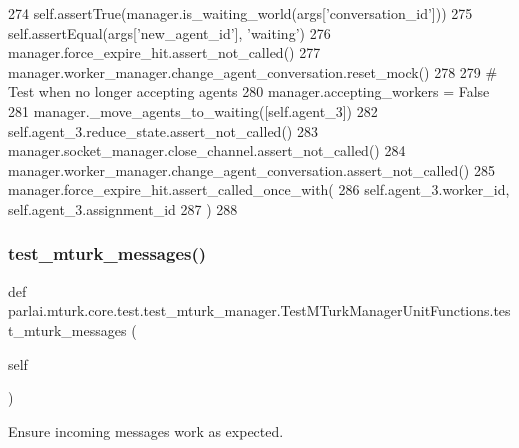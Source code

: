 \begin{DoxyCode}
274         self.assertTrue(manager.is\_waiting\_world(args[\textcolor{stringliteral}{'conversation\_id'}]))
275         self.assertEqual(args[\textcolor{stringliteral}{'new\_agent\_id'}], \textcolor{stringliteral}{'waiting'})
276         manager.force\_expire\_hit.assert\_not\_called()
277         manager.worker\_manager.change\_agent\_conversation.reset\_mock()
278 
279         \textcolor{comment}{# Test when no longer accepting agents}
280         manager.accepting\_workers = \textcolor{keyword}{False}
281         manager.\_move\_agents\_to\_waiting([self.agent\_3])
282         self.agent\_3.reduce\_state.assert\_not\_called()
283         manager.socket\_manager.close\_channel.assert\_not\_called()
284         manager.worker\_manager.change\_agent\_conversation.assert\_not\_called()
285         manager.force\_expire\_hit.assert\_called\_once\_with(
286             self.agent\_3.worker\_id, self.agent\_3.assignment\_id
287         )
288 
\end{DoxyCode}
\mbox{\label{classparlai_1_1mturk_1_1core_1_1test_1_1test__mturk__manager_1_1TestMTurkManagerUnitFunctions_ab55e425b326e7f06365263ab155ae02c}} 
\subsubsection{\texorpdfstring{test\+\_\+mturk\+\_\+messages()}{test\_mturk\_messages()}}
{\footnotesize\ttfamily def parlai.\+mturk.\+core.\+test.\+test\+\_\+mturk\+\_\+manager.\+Test\+M\+Turk\+Manager\+Unit\+Functions.\+test\+\_\+mturk\+\_\+messages (\begin{DoxyParamCaption}\item[{}]{self }\end{DoxyParamCaption})}

\begin{DoxyVerb}Ensure incoming messages work as expected.
\end{DoxyVerb}
 

